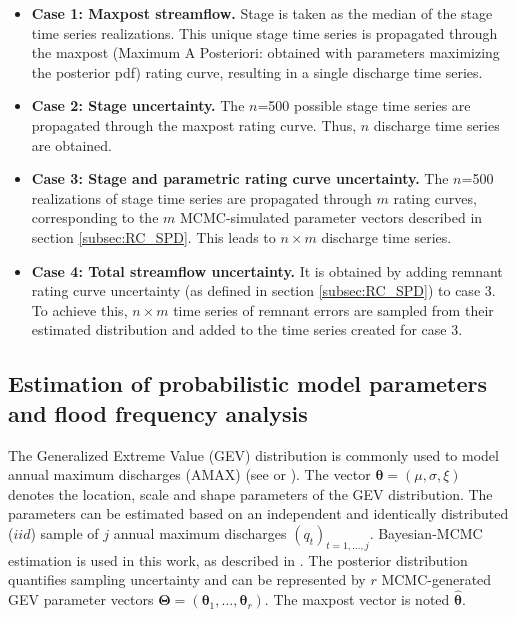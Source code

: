    \begin{itemize}
       \item \textbf{Case 1: Maxpost streamflow.} Stage is taken as the median of the stage time series realizations. This unique stage time series is propagated through the maxpost (Maximum A Posteriori: obtained with parameters maximizing the posterior pdf) rating curve, resulting in a single discharge time series. 
       
       \item \textbf{Case 2: Stage uncertainty.} The $n$=500 possible stage time series are propagated through the maxpost rating curve. Thus, $n$ discharge time series are obtained.
       
       \item \textbf{Case 3: Stage and parametric rating curve uncertainty.} The $n$=500 realizations of stage time series are propagated through $m$ rating curves, corresponding to the $m$ MCMC-simulated parameter vectors described in section \ref{subsec:RC_SPD}. This leads to $n \times m$ discharge time series. 
       
       \item \textbf{Case 4: Total streamflow uncertainty.} It is obtained by adding remnant rating curve uncertainty (as defined in section \ref{subsec:RC_SPD}) to case 3. To achieve this, $n \times m$ time series of remnant errors are sampled from their estimated distribution and added to the time series created for case 3. 
   \end{itemize}
   
    \subsection{Estimation of probabilistic model parameters and flood frequency analysis}
    \label{subsec:FFA}
    
    The Generalized Extreme Value (GEV) distribution is commonly used to model annual maximum discharges (AMAX) (see \citet{hamed_flood_2019} or \citet{jain_design_2019}). The vector $\boldsymbol{\theta} = (\mu,\sigma,\xi)$ denotes the location, scale and shape parameters of the GEV distribution. The parameters can be estimated based on an independent and identically distributed ($iid$) sample of $j$ annual maximum discharges $(q_t)_{t=1,...,j}$. Bayesian-MCMC estimation is used in this work, as described in \citet{coles_classical_2001}. The posterior distribution quantifies sampling uncertainty and can be represented by $r$ MCMC-generated GEV parameter vectors $\boldsymbol{\Theta} = (\boldsymbol{\theta}_1,...,\boldsymbol{\theta}_r)$. The maxpost vector is noted $\boldsymbol{\hat{\theta}}$.
    
